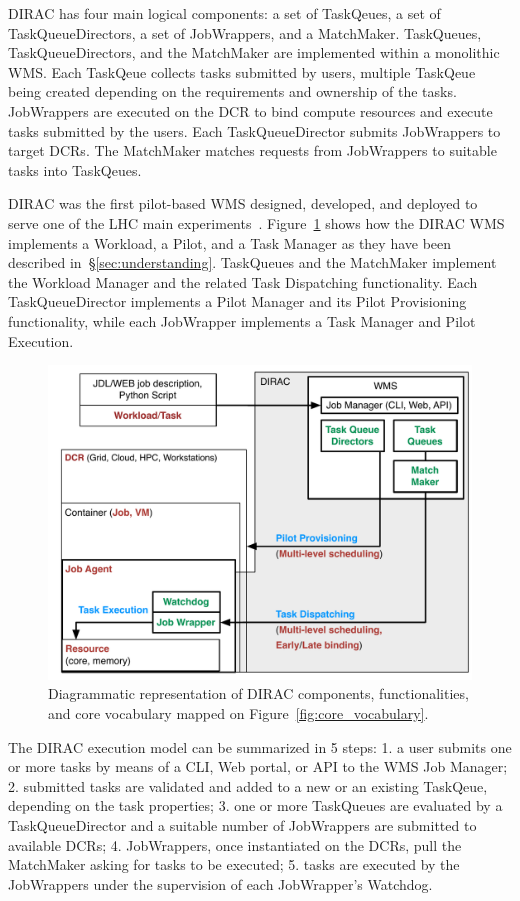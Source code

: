 \documentclass{sig-alternate}
\begin{document}
DIRAC has four main logical components: a set of TaskQeues, a set of
TaskQueueDirectors, a set of JobWrappers, and a MatchMaker. TaskQueues,
TaskQueueDirectors, and the MatchMaker are implemented within a monolithic WMS.
Each TaskQeue collects tasks submitted by users, multiple TaskQeue being created
depending on the requirements and ownership of the tasks. JobWrappers are
executed on the DCR to bind compute resources and execute tasks submitted by the
users. Each TaskQueueDirector submits JobWrappers to target DCRs. The MatchMaker
matches requests from JobWrappers to suitable tasks into TaskQeues.

DIRAC was the first pilot-based WMS designed, developed, and deployed to serve
one of the LHC main experiments~\cite{casajus2010dirac}.
Figure~\ref{fig:dirac_comparison} shows how the DIRAC WMS implements a Workload,
a Pilot, and a Task Manager as they have been described
in~\S\ref{sec:understanding}. TaskQueues and the MatchMaker implement the
Workload Manager and the related Task Dispatching functionality. Each
TaskQueueDirector implements a Pilot Manager and its Pilot Provisioning
functionality, while each JobWrapper implements a Task Manager and Pilot
Execution.

\begin{figure}[t]
    \centering
        \includegraphics[width=.48\textwidth]{figures/dirac_comparison.pdf}
    \caption{Diagrammatic representation of DIRAC components, functionalities,
    and core vocabulary mapped on Figure~\ref{fig:core_vocabulary}.}
    \label{fig:dirac_comparison}
\end{figure}

The DIRAC execution model can be summarized in 5 steps: 1. a user submits one or
more tasks by means of a CLI, Web portal, or API to the WMS Job Manager; 2.
submitted tasks are validated and added to a new or an existing TaskQeue,
depending on the task properties; 3. one or more TaskQueues are evaluated by a
TaskQueueDirector and a suitable number of JobWrappers are submitted to
available DCRs; 4. JobWrappers, once instantiated on the DCRs, pull the
MatchMaker asking for tasks to be executed; 5. tasks are executed by the
JobWrappers under the supervision of each JobWrapper's Watchdog.
\end{document}
